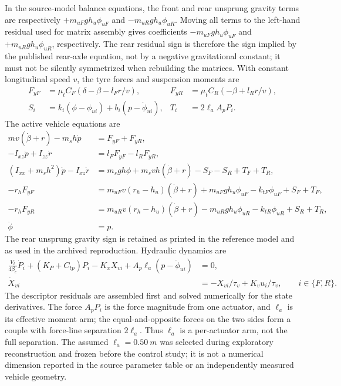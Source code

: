 \documentclass[10pt,a4paper]{article}
\newcommand{\finalnew}[1]{#1}
\begin{document}
\finalnew{In the source-model balance equations, the front and rear unsprung gravity terms are respectively $+m_{uF}gh_u\phi_{uF}$ and $-m_{uR}gh_u\phi_{uR}$. Moving all terms to the left-hand residual used for matrix assembly gives coefficients $-m_{uF}gh_u\phi_{uF}$ and $+m_{uR}gh_u\phi_{uR}$, respectively. The rear residual sign is therefore the sign implied by the published rear-axle equation, not by a negative gravitational constant; it must not be silently symmetrized when rebuilding the matrices.}
With constant longitudinal speed $v$, the tyre forces and suspension moments are
\begin{align}
F_{yF}&=\mu_t C_F(\delta-\beta-l_Fr/v),&
F_{yR}&=\mu_t C_R(-\beta+l_Rr/v),\\
S_i&=k_i(\phi-\phi_{ui})+b_i(p-\dot\phi_{ui}),&
T_i&=2\ell_aA_pP_i.
\end{align}
The active vehicle equations are
\begin{align}
mv(\dot\beta+r)-m_sh\dot p&=F_{yF}+F_{yR},\\
-I_{xz}\dot p+I_{zz}\dot r&=l_FF_{yF}-l_RF_{yR},\\
(I_{xx}+m_sh^2)\dot p-I_{xz}\dot r
 &=m_sgh\phi+m_svh(\dot\beta+r)-S_F-S_R+T_F+T_R,\\
-r_hF_{yF}&=m_{uF}v(r_h-h_u)(\dot\beta+r)+m_{uF}gh_u\phi_{uF}
-k_{tF}\phi_{uF}+S_F+T_F,\\
-r_hF_{yR}&=m_{uR}v(r_h-h_u)(\dot\beta+r)-m_{uR}gh_u\phi_{uR}
-k_{tR}\phi_{uR}+S_R+T_R,\\
\dot\phi&=p.
\end{align}
The rear unsprung gravity sign is retained as printed in the reference model and as used in the archived reproduction. Hydraulic dynamics are
\begin{align}
\frac{V_t}{4\beta_e}\dot P_i+(K_P+C_{tp})P_i-K_xX_{vi}
+A_p\ell_a(p-\dot\phi_{ui})&=0,\\
\dot X_{vi}&=-X_{vi}/\tau_v+K_vu_i/\tau_v,\qquad i\in\{F,R\}.
\end{align}
The descriptor residuals are assembled first and solved numerically for the state derivatives. The force $A_pP_i$ is the force magnitude from one actuator, and $\ell_a$ is its effective moment arm; the equal-and-opposite forces on the two sides form a couple with force-line separation $2\ell_a$. Thus $\ell_a$ is a per-actuator arm, not the full separation. The assumed $\ell_a=\SI{0.50}{m}$ was selected during exploratory reconstruction and frozen before the control study; it is not a numerical dimension reported in the source parameter table or an independently measured vehicle geometry.
\end{document}
